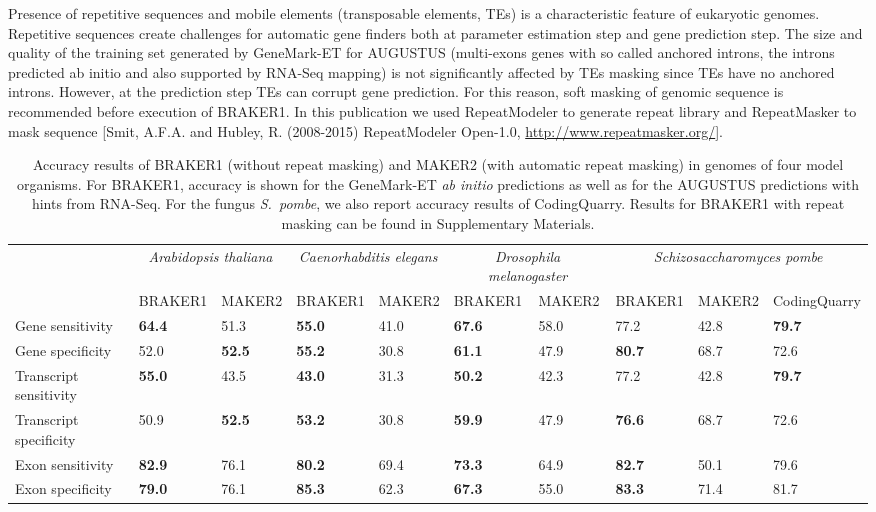 \documentclass[a4paper,10pt]{article}
\begin{document}
Presence of repetitive sequences and mobile elements (transposable elements, TEs) is a characteristic feature of eukaryotic genomes. Repetitive sequences create challenges for automatic gene finders both at parameter estimation step and gene prediction step. The size and quality of the training set generated by GeneMark-ET for AUGUSTUS (multi-exons genes with so called anchored introns, the introns predicted ab initio and also supported by RNA-Seq mapping) is not significantly affected by TEs masking since TEs have no anchored introns. However, at the prediction step TEs can corrupt gene prediction. For this reason, soft masking of genomic sequence is recommended before execution of BRAKER1. In this publication we used RepeatModeler to generate repeat library and RepeatMasker to mask sequence [Smit, A.F.A. and Hubley, R. (2008-2015) RepeatModeler Open-1.0, \url{http://www.repeatmasker.org/}].

\begin{table}
\caption{Accuracy results of BRAKER1 (without repeat masking) and MAKER2 (with automatic repeat masking) in genomes of four model organisms. For BRAKER1, accuracy is shown for the GeneMark-ET \textit{ab initio} predictions as well as for the AUGUSTUS predictions with hints from RNA-Seq. For the fungus \textit{S.~pombe}, we also report accuracy results of CodingQuarry. Results for BRAKER1 with repeat masking can be found in Supplementary Materials.\label{Tab:01}}
\begin{tabular}{lp{.9cm}p{.9cm}p{.9cm}p{.9cm}p{.9cm}p{.9cm}p{.9cm}p{.9cm}p{.9cm}}\hline
 & \multicolumn{2}{c}{\textit{Arabidopsis thaliana}} &  \multicolumn{2}{c}{\textit{Caenorhabditis elegans}} &  \multicolumn{2}{c}{\textit{Drosophila melanogaster}} &  \multicolumn{3}{c}{\textit{Schizosaccharomyces pombe}}\\
 & \tiny{BRAKER1} & \tiny{MAKER2} &  \tiny{BRAKER1} & \tiny{MAKER2}  & \tiny{BRAKER1} & \tiny{MAKER2} &\tiny{BRAKER1} & \tiny{MAKER2} &\tiny{CodingQuarry}\\
 \hline
Gene sensitivity        & \textbf{64.4} & 51.3          & \textbf{55.0} & 41.0 & \textbf{67.6} & 58.0 & 77.2 & 42.8 & \textbf{79.7}\\
Gene specificity        & 52.0          & \textbf{52.5} & \textbf{55.2} & 30.8 & \textbf{61.1} & 47.9 & \textbf{80.7} & 68.7 & 72.6\\
Transcript sensitivity  & \textbf{55.0} & 43.5          & \textbf{43.0} & 31.3 & \textbf{50.2} & 42.3 & 77.2 & 42.8 & \textbf{79.7}\\
Transcript specificity  & 50.9          & \textbf{52.5} & \textbf{53.2} & 30.8 & \textbf{59.9} & 47.9 & \textbf{76.6} & 68.7 & 72.6\\
Exon sensitivity        & \textbf{82.9} & 76.1          & \textbf{80.2} & 69.4 & \textbf{73.3} & 64.9 & \textbf{82.7} & 50.1 & 79.6\\
Exon specificity        & \textbf{79.0} & 76.1          & \textbf{85.3} & 62.3 & \textbf{67.3} & 55.0 & \textbf{83.3} & 71.4 & 81.7\\
\hline

\end{tabular}
\end{table}
\end{document}
